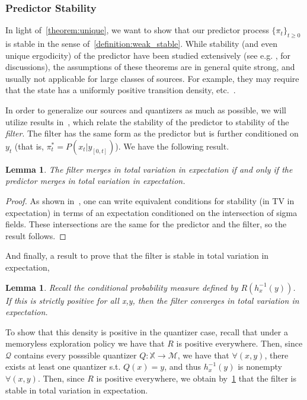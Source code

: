 \documentclass{article}
\newtheorem{lemma}[theorem]{Lemma}
\begin{document}
\subsubsection*{Predictor Stability}
In light of~\ref{theorem:unique}, we want to show that our predictor process \( \{\pi_t\}_{t\ge0} \) is stable in the sense of~\ref{definition:weak_stable}. While stability (and even unique ergodicity) of the predictor have been studied extensively (see e.g. \cite{Chigansky}, \cite{DM} for discussions), the assumptions of these theorems are in general quite strong, and usually not applicable for large classes of sources. For example, they may require that the state has a uniformly positive transition density, etc.~\cite{Chigansky}.  %

In order to generalize our sources and quantizers as much as possible, we will utilize results in~\cite{Curtis}, which relate the stability of the predictor to stability of the \emph{filter}. The filter has the same form as the predictor but is further conditioned on \( y_t \) (that is, \( \pi_t^* = P(x_t | y_{[0,t]}) \)). We have the following result.

\begin{lemma}\label{lemma:filter-predictor}\cite[Theorem 2.11]{Curtis}
    The filter merges in total variation in expectation if and only if the predictor merges in total variation in expectation.
\end{lemma}

\begin{proof}
    As shown in~\cite{Curtis}, one can write equivalent conditions for stability (in TV in expectation) in terms of an expectation conditioned on the intersection of sigma fields. These intersections are the same for the predictor and the filter, so the result follows.
\end{proof}

And finally, a result to prove that the filter is stable in total variation in expectation,

\begin{lemma}\label{lemma:nondegenerate}\cite[Corollary 5.5]{Handel}
    Recall the conditional probability measure defined by \( R(h_x^{-1}(y)) \). If this is strictly positive for all x,y, then the filter converges in total variation in expectation.
\end{lemma}

To show that this density is positive in the quantizer case, recall that under a memoryless exploration policy we have that \(R\) is positive everywhere. Then, since \( \mathcal{Q} \) contains every posssible quantizer \( Q : \mathbb{X} \to \mathcal{M} \), we have that \( \forall (x,y) \), there exists at least one quantizer s.t. \( Q(x) = y \), and thus \( h_x^{-1}(y) \) is nonempty \( \forall (x,y) \). Then, since \(R\) is positive everywhere, we obtain by~\ref{lemma:nondegenerate} that the filter is stable in total variation in expectation.
\end{document}
